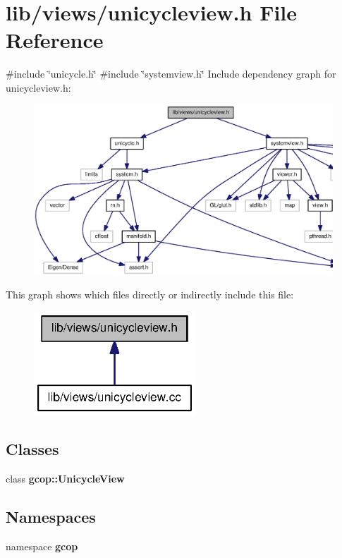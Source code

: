 \section{lib/views/unicycleview.h \-File \-Reference}
\label{unicycleview_8h}
{\ttfamily \#include \char`\"{}unicycle.\-h\char`\"{}}\*
{\ttfamily \#include \char`\"{}systemview.\-h\char`\"{}}\*
\-Include dependency graph for unicycleview.\-h\-:\nopagebreak
\begin{figure}[H]
\begin{center}
\leavevmode
\includegraphics[width=350pt]{unicycleview_8h__incl}
\end{center}
\end{figure}
\-This graph shows which files directly or indirectly include this file\-:\nopagebreak
\begin{figure}[H]
\begin{center}
\leavevmode
\includegraphics[width=172pt]{unicycleview_8h__dep__incl}
\end{center}
\end{figure}
\subsection*{\-Classes}
\begin{DoxyCompactItemize}
\item 
class {\bf gcop\-::\-Unicycle\-View}
\end{DoxyCompactItemize}
\subsection*{\-Namespaces}
\begin{DoxyCompactItemize}
\item 
namespace {\bf gcop}
\end{DoxyCompactItemize}
